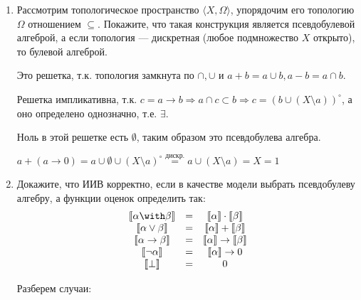 \begin{enumerate}
    \item Рассмотрим топологическое пространство $\langle X, \Omega \rangle$, упорядочим его топологию $\Omega$ отношением $\subseteq$.
          Покажите, что такая конструкция является псевдобулевой алгеброй, а если топология --- дискретная (любое подмножество $X$ открыто),
          то булевой алгеброй.

          Это решетка, т.к. топология замкнута по \(\cap, \cup\) и \(a + b = a\cup b, a - b = a\cap b\).

          Решетка импликативна, т.к. \(c = a \to b \Rightarrow  a\cap c \subset b \Rightarrow c = (b \cup (X\setminus a))^\circ\), а оно определено однозначно, т.е. \(\exists \).

          Ноль в этой решетке есть \(\emptyset\), таким образом это псевдобулева алгебра.

          \(a + (a \to 0) = a\cup \emptyset \cup (X\setminus a)^\circ \stackrel{\text{дискр.}}{=} a \cup (X\setminus a) = X = 1\)

    \item Докажите, что ИИВ корректно, если в качестве модели выбрать псевдобулеву алгебру, а функции оценок определить так:
          \[\begin{array}{ccc}
                  \llbracket\alpha \with \beta\rrbracket       & = & \llbracket\alpha\rrbracket \cdot \llbracket\beta\rrbracket       \\
                  \llbracket\alpha \vee \beta\rrbracket        & = & \llbracket\alpha\rrbracket + \llbracket\beta\rrbracket           \\
                  \llbracket\alpha \rightarrow \beta\rrbracket & = & \llbracket\alpha\rrbracket \rightarrow \llbracket\beta\rrbracket \\
                  \llbracket\neg\alpha\rrbracket               & = & \llbracket\alpha\rrbracket \rightarrow 0                         \\
                  \llbracket\bot\rrbracket                     & = & 0                                                                \\
              \end{array}\]

          Разберем случаи:


\end{enumerate}
